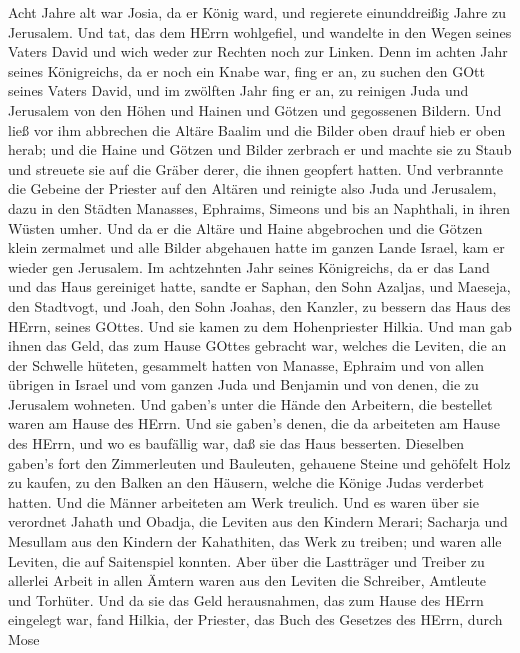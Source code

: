  Acht Jahre alt war Josia, da er König ward, und regierete
einunddreißig Jahre zu Jerusalem.  Und tat, das dem HErrn
wohlgefiel, und wandelte in den Wegen seines Vaters David und wich weder
zur Rechten noch zur Linken.  Denn im achten Jahr seines
Königreichs, da er noch ein Knabe war, fing er an, zu suchen den GOtt
seines Vaters David, und im zwölften Jahr fing er an, zu reinigen Juda
und Jerusalem von den Höhen und Hainen und Götzen und gegossenen
Bildern.  Und ließ vor ihm abbrechen die Altäre Baalim und
die Bilder oben drauf hieb er oben herab; und die Haine und Götzen und
Bilder zerbrach er und machte sie zu Staub und streuete sie auf die
Gräber derer, die ihnen geopfert hatten.  Und verbrannte die
Gebeine der Priester auf den Altären und reinigte also Juda und
Jerusalem,  dazu in den Städten Manasses, Ephraims, Simeons
und bis an Naphthali, in ihren Wüsten umher.  Und da er die
Altäre und Haine abgebrochen und die Götzen klein zermalmet und alle
Bilder abgehauen hatte im ganzen Lande Israel, kam er wieder gen
Jerusalem.  Im achtzehnten Jahr seines Königreichs, da er
das Land und das Haus gereiniget hatte, sandte er Saphan, den Sohn
Azaljas, und Maeseja, den Stadtvogt, und Joah, den Sohn Joahas, den
Kanzler, zu bessern das Haus des HErrn, seines GOttes.  Und
sie kamen zu dem Hohenpriester Hilkia. Und man gab ihnen das Geld, das
zum Hause GOttes gebracht war, welches die Leviten, die an der Schwelle
hüteten, gesammelt hatten von Manasse, Ephraim und von allen übrigen in
Israel und vom ganzen Juda und Benjamin und von denen, die zu Jerusalem
wohneten.  Und gaben's unter die Hände den Arbeitern, die
bestellet waren am Hause des HErrn. Und sie gaben's denen, die da
arbeiteten am Hause des HErrn, und wo es baufällig war, daß sie das Haus
besserten.  Dieselben gaben's fort den Zimmerleuten und
Bauleuten, gehauene Steine und gehöfelt Holz zu kaufen, zu den Balken an
den Häusern, welche die Könige Judas verderbet hatten.  Und
die Männer arbeiteten am Werk treulich. Und es waren über sie verordnet
Jahath und Obadja, die Leviten aus den Kindern Merari; Sacharja und
Mesullam aus den Kindern der Kahathiten, das Werk zu treiben; und waren
alle Leviten, die auf Saitenspiel konnten.  Aber über die
Lastträger und Treiber zu allerlei Arbeit in allen Ämtern waren aus den
Leviten die Schreiber, Amtleute und Torhüter.  Und da sie
das Geld herausnahmen, das zum Hause des HErrn eingelegt war, fand
Hilkia, der Priester, das Buch des Gesetzes des HErrn, durch Mose
